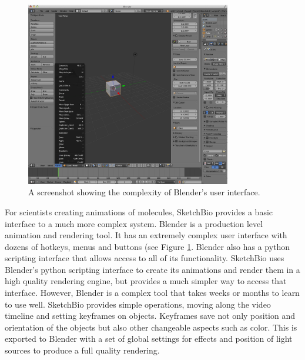 \documentclass{article} %
\begin{document}
\begin{figure}[h]
\centering
\includegraphics[width=0.8\textwidth]{blender_interface.png}
\caption{A screenshot showing the complexity of Blender's user interface.}
\label{fig:blender_interface}
\end{figure}

For scientists creating animations of molecules, SketchBio provides a basic interface to a much more complex system.  Blender is a production level animation and rendering tool.  It has an extremely complex user interface with dozens of hotkeys, menus and buttons (see Figure \ref{fig:blender_interface}.  Blender also has a python scripting interface that allows access to all of its functionality.  SketchBio uses Blender's python scripting interface to create its animations and render them in a high quality rendering engine, but provides a much simpler way to access that interface.  However, Blender is a complex tool that takes weeks or months to learn to use well.  SketchBio provides simple operations, moving along the video timeline and setting keyframes on objects.  Keyframes save not only position and orientation of the objects but also other changeable aspects such as color.  This is exported to Blender with a set of global settings for effects and position of light sources to produce a full quality rendering.
\end{document}
